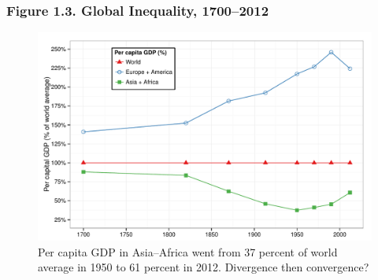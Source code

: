\documentclass[t]{beamer}\usepackage[]{graphicx}\usepackage[]{color}
\newenvironment{knitrout}{}{} %
\begin{document}
\begin{frame}[label=Figure_1_3,fragile]
\frametitle{Figure 1.3. Global Inequality, 1700--2012}
\begin{figure}[t]
\begin{minipage}[b]{\textwidth}
\centering
\begin{knitrout}\footnotesize
{}\color{fgcolor}

{\centering \includegraphics[width=1\linewidth]{figures/color/Figure_1_3} 

}



\end{knitrout}
\caption{Per capita GDP in Asia--Africa went from 37 percent of world average in 1950 to 61 percent in 2012. Divergence then convergence?}
\end{minipage}
\end{figure}
\end{frame}
\end{document}
